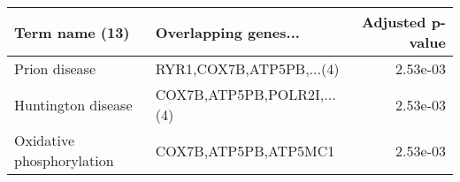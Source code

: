 \begin{tabular}{llr}
\toprule
           Term name (13) &       Overlapping genes... &  Adjusted p-value \\
\midrule
            Prion disease &   RYR1,COX7B,ATP5PB,...(4) &          2.53e-03 \\
       Huntington disease & COX7B,ATP5PB,POLR2I,...(4) &          2.53e-03 \\
Oxidative phosphorylation &       COX7B,ATP5PB,ATP5MC1 &          2.53e-03 \\
\bottomrule
\end{tabular}
